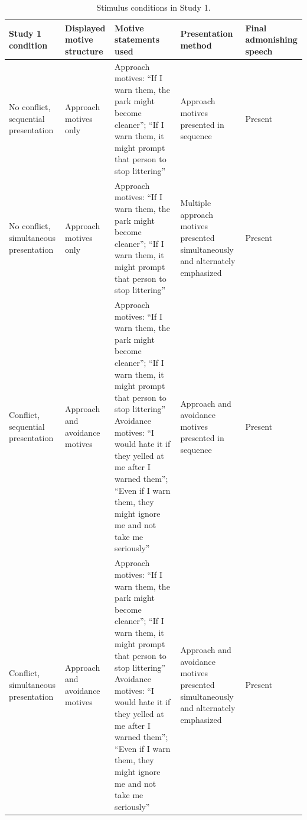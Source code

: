 \documentclass[utf8]{FrontiersinHarvard}
\begin{document}
\begin{table}[htbp]
\centering
\footnotesize
\caption{Stimulus conditions in Study 1.}
\label{tab:study1_conditions}
\begin{tabularx}{\linewidth}{>{\hsize}Y >{\hsize}Y >{\hsize}Y >{\hsize}Y >{\hsize}Y}
\toprule
\textbf{Study 1 condition} & \textbf{Displayed motive structure} & \textbf{Motive statements used} & \textbf{Presentation method} & \textbf{Final admonishing speech} \\
\midrule
No conflict, sequential presentation & Approach motives only & Approach motives: ``If I warn them, the park might become cleaner''; ``If I warn them, it might prompt that person to stop littering'' & Approach motives presented in sequence & Present \\
\midrule
No conflict, simultaneous presentation & Approach motives only & Approach motives: ``If I warn them, the park might become cleaner''; ``If I warn them, it might prompt that person to stop littering'' & Multiple approach motives presented simultaneously and alternately emphasized & Present \\
\midrule
Conflict, sequential presentation & Approach and avoidance motives & Approach motives: ``If I warn them, the park might become cleaner''; ``If I warn them, it might prompt that person to stop littering'' \newline Avoidance motives: ``I would hate it if they yelled at me after I warned them''; ``Even if I warn them, they might ignore me and not take me seriously'' & Approach and avoidance motives presented in sequence & Present \\
\midrule
Conflict, simultaneous presentation & Approach and avoidance motives & Approach motives: ``If I warn them, the park might become cleaner''; ``If I warn them, it might prompt that person to stop littering'' \newline Avoidance motives: ``I would hate it if they yelled at me after I warned them''; ``Even if I warn them, they might ignore me and not take me seriously'' & Approach and avoidance motives presented simultaneously and alternately emphasized & Present \\
\bottomrule
\end{tabularx}
\end{table}

\vspace{1em}
\end{document}
